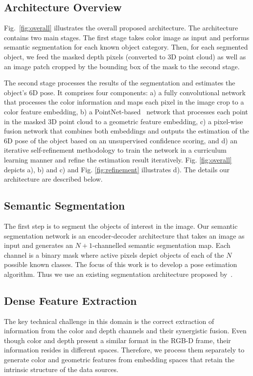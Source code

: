 \documentclass[10pt,twocolumn,letterpaper]{article}
\begin{document}
\subsection{Architecture Overview}
\label{sec::overview}

Fig.~\ref{fig:overall} illustrates the overall proposed architecture. The architecture contains two main stages. The first stage takes color image as input and performs semantic segmentation for each known object category. Then, for each segmented object, we feed the masked depth pixels (converted to 3D point cloud) as well as an image patch cropped by the bounding box of the mask to the second stage. 

The second stage processes the results of the segmentation and estimates the object's 6D pose. It comprises four components: a) a fully convolutional network that processes the color information and maps each pixel in the image crop to a color feature embedding, b) a PointNet-based~\cite{qi2016pointnet} network that processes each point in the masked 3D point cloud to a geometric feature embedding, c) a pixel-wise fusion network that combines both embeddings and outputs the estimation of the 6D pose of the object based on an unsupervised confidence scoring, and d) an iterative self-refinement methodology to train the network in a curriculum learning manner and refine the estimation result iteratively. Fig. \ref{fig:overall} depicts a), b) and c) and Fig. \ref{fig:refinement} illustrates d). The details our architecture are described below.

\subsection{Semantic Segmentation}
The first step is to segment the objects of interest in the image. Our semantic segmentation network is an encoder-decoder architecture that takes an image as input and generates an $N+1$-channelled semantic segmentation map. Each channel is a binary mask where active pixels depict objects of each of the $N$ possible known classes. The focus of this work is to develop a pose estimation algorithm. Thus we use an existing segmentation architecture proposed by~\cite{xiang2017posecnn}.

\subsection{Dense Feature Extraction}
\label{ssec::cpf}

The key technical challenge in this domain is the correct extraction of information from the color and depth channels and their synergistic fusion. Even though color and depth present a similar format in the RGB-D frame, their information resides in different spaces. Therefore, we process them separately to generate color and geometric features from embedding spaces that retain the intrinsic structure of the data sources.
\end{document}
